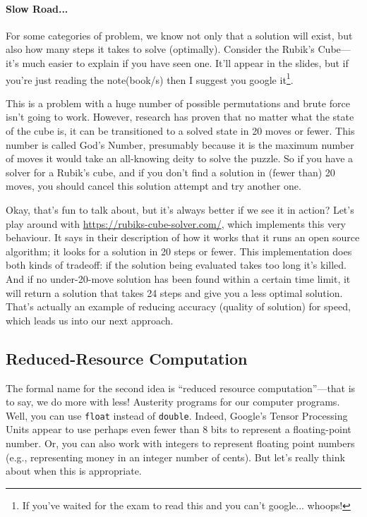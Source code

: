 \paragraph{Slow Road...}
For some categories of problem, we know not only that a solution will exist, but also how many steps it takes to solve (optimally). Consider the Rubik's Cube---it's much easier to explain if you have seen one. It'll appear in the slides, but if you're just reading the note(book/s) then I suggest you google it\footnote{If you've waited for the exam to read this and you can't google... whoops!}.

This is a problem with a huge number of possible permutations and brute force isn't going to work. However, research has proven that no matter what the state of the cube is, it can be transitioned to a solved state in 20 moves or fewer. This number is called God's Number, presumably because it is the maximum number of moves it would take an all-knowing deity to solve the puzzle. So if you have a solver for a Rubik's cube, and if you don't find a solution in (fewer than) 20 moves, you should cancel this solution attempt and try another one.

Okay, that's fun to talk about, but it's always better if we see it in action? Let's play around with \url{https://rubiks-cube-solver.com/}, which implements this very behaviour. It says in their description of how it works that it runs an open source algorithm; it looks for a solution in 20 steps or fewer. This implementation does both kinds of tradeoff: if the solution being evaluated takes too long it's killed. And if no under-20-move solution has been found within a certain time limit, it will return a solution that takes 24 steps and give you a less optimal solution. That's actually an example of reducing accuracy (quality of solution) for speed, which leads us into our next approach.

\subsection*{Reduced-Resource Computation}

The formal name for the second idea is ``reduced resource computation''---that is to say, we do more with less! Austerity programs for our computer programs. Well, you can use \texttt{float} instead of \texttt{double}. Indeed, Google's Tensor Processing Units appear to use perhaps even fewer than 8 bits to represent a floating-point number. Or, you can also work with integers to represent floating point numbers (e.g., representing money in an integer number of cents). But let's really  think about when this is appropriate.

